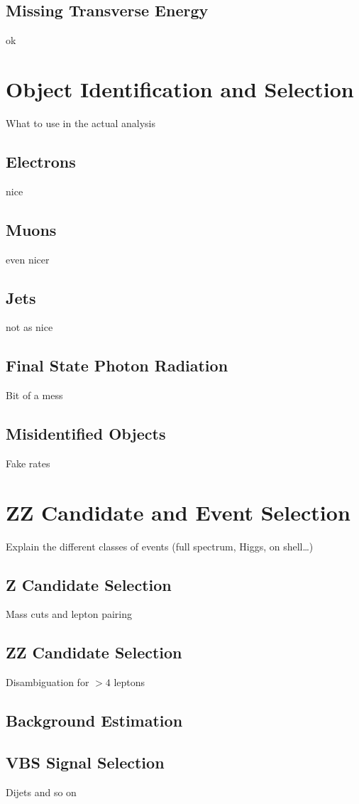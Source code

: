 \subsection{Missing Transverse Energy}
ok



\section{Object Identification and Selection}
What to use in the actual analysis

\subsection{Electrons}
nice


\subsection{Muons}
even nicer


\subsection{Jets}
not as nice


\subsection{Final State Photon Radiation}
Bit of a mess


\subsection{Misidentified Objects}\label{sec:looseID}
Fake rates



\section{ZZ Candidate and Event Selection}
Explain the different classes of events (full spectrum, Higgs, on shell\ldots)

\subsection{Z Candidate Selection}\label{sec:zSelection}
Mass cuts and lepton pairing


\subsection{ZZ Candidate Selection}
Disambiguation for $>4$ leptons


\subsection{Background Estimation}


\subsection{VBS Signal Selection}\label{sec:vbsSelection}
Dijets and so on
